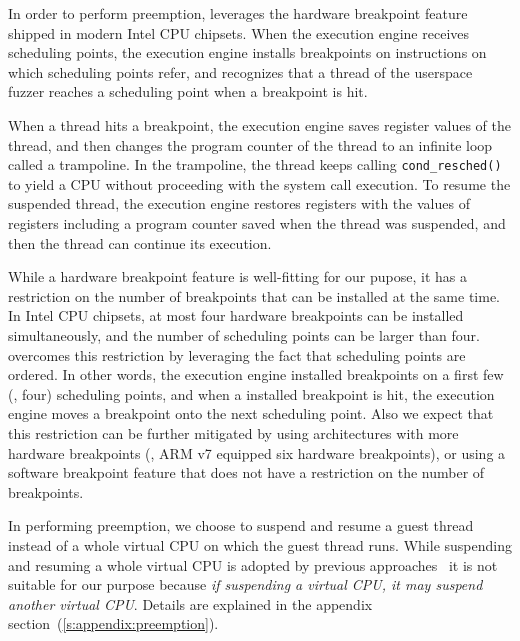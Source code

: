 %
In order to perform preemption, \sys leverages the hardware breakpoint
feature~\cite{hwbp} shipped in modern Intel CPU chipsets.
%
When the execution engine receives scheduling points, the execution
engine installs breakpoints on instructions on which scheduling points
refer, and recognizes that a thread of the userspace fuzzer reaches a
scheduling point when a breakpoint is hit.


When a thread hits a breakpoint, the execution engine saves register
values of the thread, and then changes the program counter of the
thread to an infinite loop called a trampoline.
%
In the trampoline, the thread keeps calling \texttt{cond_resched()} to
yield a CPU without proceeding with the system call execution.
%
To resume the suspended thread, the execution engine restores
registers with the values of registers including a program counter
saved when the thread was suspended, and then the thread can continue
its execution.


%
While a hardware breakpoint feature is well-fitting for our pupose, it
has a restriction on the number of breakpoints that can be installed
at the same time.
%
In Intel CPU chipsets, at most four hardware breakpoints can be
installed simultaneously, and the number of scheduling points can be
larger than four.
%
\dr{} \sys overcomes this restriction by leveraging the fact that
scheduling points are ordered. In other words, the execution engine
installed breakpoints on a first few (\eg, four) scheduling points,
and when a installed breakpoint is hit, the execution engine moves a
breakpoint onto the next scheduling point.
%
Also we expect that this restriction can be further mitigated by using
architectures with more hardware breakpoints (\eg, ARM v7 equipped six
hardware breakpoints), or using a software breakpoint feature that
does not have a restriction on the number of breakpoints.



%
In performing preemption, we choose to suspend and resume a guest
thread instead of a whole virtual CPU on which the guest thread runs.
%
While suspending and resuming a whole virtual CPU is adopted by
previous approaches~\cite{ski, snowboard, razzer} it is not suitable
for our purpose because \textit{if suspending a virtual CPU, it may
  suspend another virtual CPU}. Details are explained in the appendix
section~(\autoref{s:appendix:preemption}).




